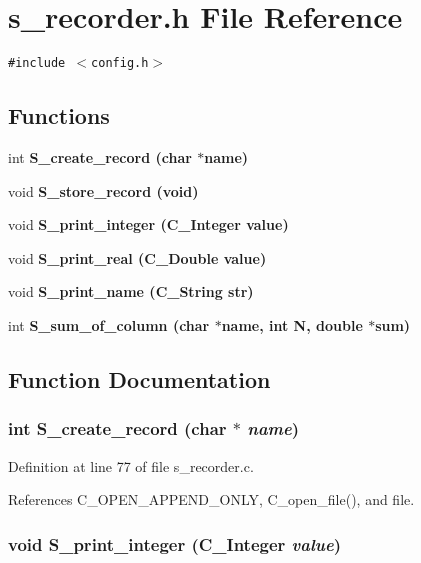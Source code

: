 \section{s\_\-recorder.h File Reference}
\label{s__recorder_8h}
{\tt \#include $<$config.h$>$}\par
\subsection*{Functions}
\begin{CompactItemize}
\item 
int \bf{S\_\-create\_\-record} (char $\ast$\bf{name})
\item 
void \bf{S\_\-store\_\-record} (void)
\item 
void \bf{S\_\-print\_\-integer} (\bf{C\_\-Integer} value)
\item 
void \bf{S\_\-print\_\-real} (\bf{C\_\-Double} value)
\item 
void \bf{S\_\-print\_\-name} (\bf{C\_\-String} str)
\item 
int \bf{S\_\-sum\_\-of\_\-column} (char $\ast$\bf{name}, int N, double $\ast$sum)
\end{CompactItemize}


\subsection{Function Documentation}
\subsubsection{\setlength{\rightskip}{0pt plus 5cm}int S\_\-create\_\-record (char $\ast$ {\em name})}\label{s__recorder_8h_c0aba05c13eae6d70f489c223d2f487c}




Definition at line 77 of file s\_\-recorder.c.

References C\_\-OPEN\_\-APPEND\_\-ONLY, C\_\-open\_\-file(), and file.
\subsubsection{\setlength{\rightskip}{0pt plus 5cm}void S\_\-print\_\-integer (\bf{C\_\-Integer} {\em value})}\label{s__recorder_8h_fae80fc71a6c1ed9ef528caf488d7eaf}




